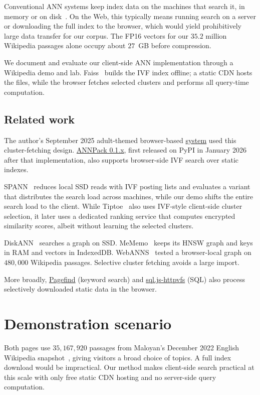 \documentclass[sigconf, screen, review, balance=false]{acmart}
\begin{document}
Conventional ANN systems keep index data on the machines that search it, in memory or on disk~\cite{DiskANN,spann}. On the Web, this typically means running search on a server or downloading the full index to the browser, which would yield prohibitively large data transfer for our corpus. The FP16 vectors for our $35.2$ million Wikipedia passages alone occupy about $27$~GB before compression.

We document and evaluate our client-side ANN implementation through a Wikipedia demo and lab. Faiss~\cite{Faiss} builds the IVF index offline; a static CDN hosts the files, while the browser fetches selected clusters and performs all query-time computation.

\subsection{Related work}
The author's September 2025 adult-themed browser-based \href{https://github.com/EchiCode/Reverse-Hentai-Search/blob/d2f10f19b0f16484b3955e40d5762455f3d68ff1/client/app.js\#L835-L887}{system} used this cluster-fetching design. \href{https://pypi.org/project/annpack/0.1.6/}{\mbox{ANNPack} 0.1.x}, first released on PyPI in January 2026 after that implementation, also supports browser-side IVF search over static indexes.

SPANN~\cite{spann} reduces local SSD reads with IVF posting lists and evaluates a variant that distributes the search load across machines, while our demo shifts the entire search load to the client. While Tiptoe~\cite[Section~4]{Tiptoe} also uses IVF-style client-side cluster selection, it later uses a dedicated ranking service that computes encrypted similarity scores, albeit without learning the selected clusters.

DiskANN~\cite{DiskANN} searches a graph on SSD. MeMemo~\cite{MeMemo} keeps its HNSW graph and keys in RAM and vectors in IndexedDB. \mbox{WebANNS}~\cite{WebANNS} tested a browser-local graph on $480{,}000$ Wikipedia passages. Selective cluster fetching avoids a large import.

More broadly, \href{https://pagefind.app/}{Pagefind} (keyword search) and \href{https://github.com/phiresky/sql.js-httpvfs}{sql.js-httpvfs} (SQL) also process selectively downloaded static data in the browser.

\section{Demonstration scenario}
\label{sec:demo}
Both pages use $35{,}167{,}920$ passages from Maloyan's December 2022 English Wikipedia snapshot~\cite{wiki-minilm}, giving visitors a broad choice of topics. A full index download would be impractical. Our method makes client-side search practical at this scale with only free static CDN hosting and no server-side query computation.
\end{document}
